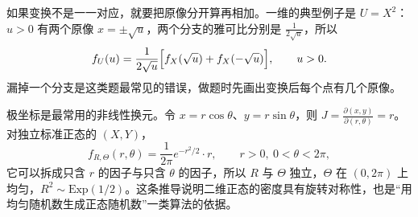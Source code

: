 如果变换不是一一对应，就要把原像分开算再相加。一维的典型例子是 $U=X^2$：$u>0$ 有两个原像 $x=\pm\sqrt u$，两个分支的雅可比分别是 $\frac{1}{2\sqrt u}$，所以
\[
f_U(u)=\frac{1}{2\sqrt u}\Bigl[f_X(\sqrt u)+f_X(-\sqrt u)\Bigr],\qquad u>0 .
\]
漏掉一个分支是这类题最常见的错误，做题时先画出变换后每个点有几个原像。

极坐标是最常用的非线性换元。令 $x=r\cos\theta$、$y=r\sin\theta$，则 $J=\frac{\partial(x,y)}{\partial(r,\theta)}=r$。对独立标准正态的 $(X,Y)$，
\[
f_{R,\Theta}(r,\theta)=\frac{1}{2\pi}e^{-r^2/2}\cdot r,\qquad r>0,\ 0<\theta<2\pi,
\]
它可以拆成只含 $r$ 的因子与只含 $\theta$ 的因子，所以 $R$ 与 $\Theta$ 独立，$\Theta$ 在 $(0,2\pi)$ 上均匀，$R^2\sim\mathrm{Exp}(1/2)$。这条推导说明二维正态的密度具有旋转对称性，也是“用均匀随机数生成正态随机数”一类算法的依据。

\newpage


